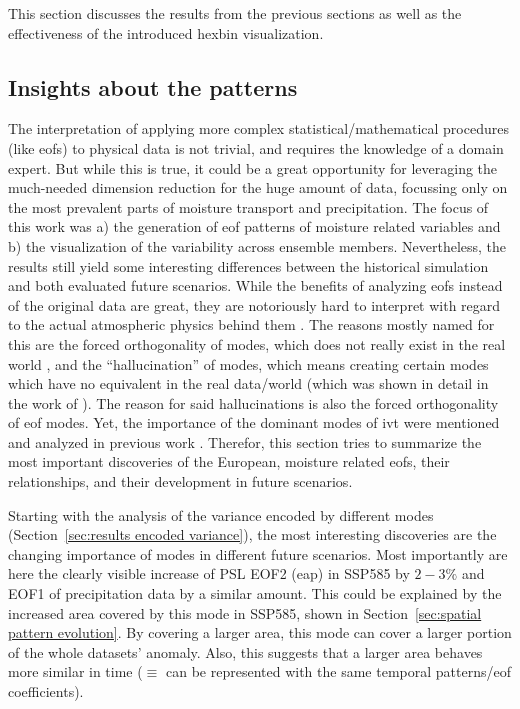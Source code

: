 This section discusses the results from the previous sections as well as the effectiveness of the introduced hexbin visualization. 

\subsection{Insights about the patterns}

The interpretation of applying more complex statistical/mathematical procedures (like \acp{eof}) to physical data is not trivial, and requires the knowledge of a domain expert. 
But while this is true, it could be a great opportunity for leveraging the much-needed dimension reduction for the huge amount of data, focussing only on the most prevalent parts of moisture transport and precipitation.   
The focus of this work was a) the generation of \ac{eof} patterns of moisture related variables and b) the visualization of the variability across ensemble members. 
Nevertheless, the results still yield some interesting differences between the historical simulation and both evaluated future scenarios. 
While the benefits of analyzing \acp{eof} instead of the original data are great, they are notoriously hard to interpret with regard to the actual atmospheric physics behind them \cite{dommenget_cautionary_2002, hannachi_empirical_2007}.
The reasons mostly named for this are the forced orthogonality of modes, which does not really exist in the real world \cite{hannachi_empirical_2007}, and the \enquote{hallucination} of modes, which means creating certain modes which have no equivalent in the real data/world (which was shown in detail in the work of ). 
The reason for said hallucinations is also the forced orthogonality of \ac{eof} modes. 
Yet, the importance of the dominant modes of \ac{ivt} were mentioned and analyzed in previous work \cite{salstein_modes_1983, zou_interdecadal_2018}. 
Therefor, this section tries to summarize the most important discoveries of the European, moisture related \acp{eof}, their relationships, and their development in future scenarios. 

Starting with the analysis of the variance encoded by different modes (Section~\ref{sec:results encoded variance}), the most interesting discoveries are the changing importance of modes in different future scenarios. 
Most importantly are here the clearly visible increase of PSL EOF2 (\ac{eap}) in SSP585 by $2-3 \%$ and EOF1 of precipitation data by a similar amount. 
This could be explained by the increased area covered by this mode in SSP585, shown in Section~\ref{sec:spatial pattern evolution}. 
By covering a larger area, this mode can cover a larger portion of the whole datasets' anomaly. 
Also, this suggests that a larger area behaves more similar in time ($\equiv$ can be represented with the same temporal patterns/\ac{eof} coefficients). 


